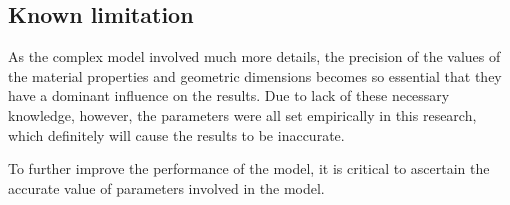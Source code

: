 \documentclass[10pt,a4paper,twocolumn,twoside,UTF8]{article}
\begin{document}
	\subsection{Known limitation}
	As the complex model involved much more details, the precision of the values of the material properties and geometric dimensions becomes so essential that they have a dominant influence on the results.
	Due to lack of these necessary knowledge, however, the parameters were all set empirically in this research, which definitely will cause the results to be inaccurate.

	To further improve the performance of the model, it is critical to ascertain the accurate value of parameters involved in the model.



\printbibliography[title=Reference] 
\end{document}

